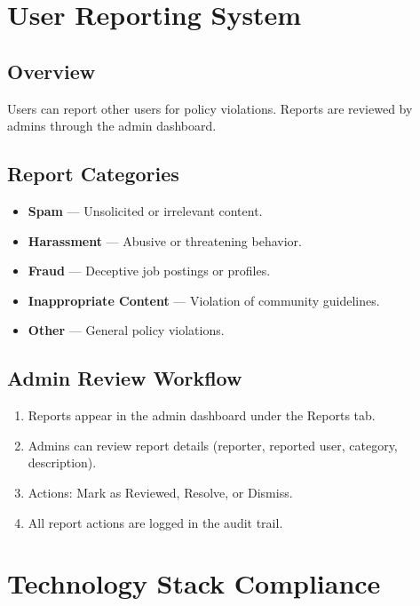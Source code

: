 \documentclass[12pt,a4paper]{article}
\begin{document}
\newpage

\section{User Reporting System}

\subsection{Overview}
Users can report other users for policy violations. Reports are reviewed by admins through the admin dashboard.

\subsection{Report Categories}
\begin{itemize}
  \item \textbf{Spam} --- Unsolicited or irrelevant content.
  \item \textbf{Harassment} --- Abusive or threatening behavior.
  \item \textbf{Fraud} --- Deceptive job postings or profiles.
  \item \textbf{Inappropriate Content} --- Violation of community guidelines.
  \item \textbf{Other} --- General policy violations.
\end{itemize}

\subsection{Admin Review Workflow}
\begin{enumerate}
  \item Reports appear in the admin dashboard under the Reports tab.
  \item Admins can review report details (reporter, reported user, category, description).
  \item Actions: Mark as Reviewed, Resolve, or Dismiss.
  \item All report actions are logged in the audit trail.
\end{enumerate}

\newpage

\section{Technology Stack Compliance}
\end{document}
